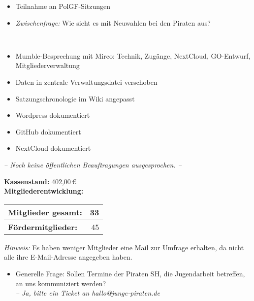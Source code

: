 \begin{Protokoll}
\begin{description}
\begin{itemize}
            \item Teilnahme an PolGF-Sitzungen
            \item \emph{Zwischenfrage:} Wie sieht es mit Neuwahlen bei den Piraten aus?
        \end{itemize}
        \item[\getPersonAsWebsiteLink{FeW}:] \     
        \begin{itemize}
            \item Mumble-Besprechung mit Mirco: Technik, Zugänge, NextCloud, GO-Entwurf, Mitgliederverwaltung
            \item Daten in zentrale Verwaltungsdatei verschoben
            \item Satzungschronologie im Wiki angepasst
            \item Wordpress dokumentiert
            \item GitHub dokumentiert
            \item NextCloud dokumentiert
        \end{itemize}
    \end{description}
    
        \emph{-- Noch keine öffentlichen Beauftragungen ausgesprochen. --}
    
    \newpage
    
    
    \textbf{Kassenstand:} 402,00\,\euro \\
    
    \noindent\textbf{Mitgliederentwicklung:}
    \begin{center}
        \begin{tabular}{|l||r|}
            \hline
            \textbf{Mitglieder gesamt:}             & 33  \\
            \hline
            \textbf{Fördermitglieder:}               & 45 \\                
            \hline
            \hline
        \end{tabular}
    \end{center}
    
    \emph{Hinweis:} Es haben weniger Mitglieder eine Mail zur Umfrage erhalten, da nicht alle ihre E-Mail-Adresse angegeben haben.
    
      \begin{itemize}
        \item Generelle Frage: Sollen Termine der Piraten SH, die Jugendarbeit betreffen, an uns kommuniziert werden? \\
        \emph{-- Ja, bitte ein Ticket an hallo@junge-piraten.de}
    \end{itemize}
    

\end{Protokoll}

